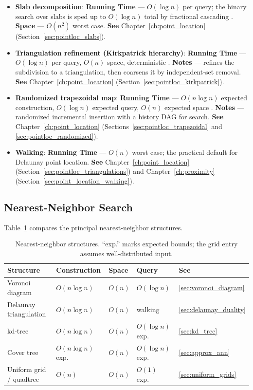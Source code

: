 \begin{itemize}
  \item \textbf{Slab decomposition}: \textbf{Running Time} --- $O(\log n)$
    per query; the binary search over slabs is sped up to $O(\log n)$ total
    by fractional cascading \cite{preparata1985}. \textbf{Space} --- $O(n^2)$
    worst case. \textbf{See} Chapter~\ref{ch:point_location}
    (Section~\ref{sec:pointloc_slabs}).
  \item \textbf{Triangulation refinement (Kirkpatrick hierarchy)}:
    \textbf{Running Time} --- $O(\log n)$ per query, $O(n)$ space,
    deterministic \cite{kirkpatrick1983}. \textbf{Notes} --- refines the
    subdivision to a triangulation, then coarsens it by independent-set
    removal. \textbf{See} Chapter~\ref{ch:point_location}
    (Section~\ref{sec:pointloc_kirkpatrick}).
  \item \textbf{Randomized trapezoidal map}: \textbf{Running Time} ---
    $O(n\log n)$ expected construction, $O(\log n)$ expected query, $O(n)$
    expected space \cite{seidel1991}. \textbf{Notes} --- randomized
    incremental insertion with a history DAG for search. \textbf{See}
    Chapter~\ref{ch:point_location} (Sections~\ref{sec:pointloc_trapezoidal}
    and \ref{sec:pointloc_randomized}).
  \item \textbf{Walking}: \textbf{Running Time} --- $O(n)$
    worst case; the practical default for Delaunay point location.
    \textbf{See} Chapter~\ref{ch:point_location}
    (Section~\ref{sec:pointloc_triangulations}) and Chapter~\ref{ch:proximity}
    (Section~\ref{sec:point_location_walking}).
\end{itemize}

\subsection{Nearest-Neighbor Search}
\label{sec:appalgs_bsearch_nn}

Table~\ref{tbl:appalgs_nn} compares the principal nearest-neighbor
structures.

\begin{table}[htbp]
\centering
\begin{tabular}{lllll}
\toprule
Structure & Construction & Space & Query & See \\
\midrule
Voronoi diagram    & $O(n\log n)$ & $O(n)$ & $O(\log n)$ & \ref{sec:voronoi_diagram} \\
Delaunay triangulation & $O(n\log n)$ & $O(n)$ & walking & \ref{sec:delaunay_duality} \\
kd-tree            & $O(n\log n)$ & $O(n)$ & $O(\log n)$ exp.\ & \ref{sec:kd_tree} \\
Cover tree         & $O(n\log n)$ exp.\ & $O(n)$ & $O(\log n)$ exp.\ & \ref{sec:approx_ann} \\
Uniform grid / quadtree & $O(n)$ & $O(n)$ & $O(1)$ exp.\ & \ref{sec:uniform_grids} \\
\bottomrule
\end{tabular}
\caption{Nearest-neighbor structures. ``exp.'' marks expected bounds; the
grid entry assumes well-distributed input.}
\label{tbl:appalgs_nn}
\end{table}

